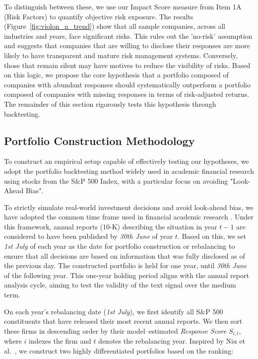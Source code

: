 \documentclass[sigconf]{acmart}
\begin{document}
To distinguish between these, we use our Impact Score measure from Item 1A (Risk Factors) to quantify objective risk exposure. The results (Figure~\ref{fig:violon_n_trend}) show that all sample companies, across all industries and years, face significant risks. This rules out the 'no-risk' assumption and suggests that companies that are willing to disclose their responses are more likely to have transparent and mature risk management systems. Conversely, those that remain silent may have motives to reduce the visibility of risks. Based on this logic, we propose the core hypothesis that a portfolio composed of companies with abundant responses should systematically outperform a portfolio composed of companies with missing responses in terms of risk-adjusted returns. The remainder of this section rigorously tests this hypothesis through backtesting.

\subsection{Portfolio Construction Methodology}

To construct an empirical setup capable of effectively testing our hypotheses, we adopt the portfolio backtesting method widely used in academic financial research using stocks from the S\&P 500 Index, with a particular focus on avoiding "Look-Ahead Bias".

To strictly simulate real-world investment decisions and avoid look-ahead bias, we have adopted the common time frame used in financial academic research \cite{fama1993common, carhart1997persistence, cooper2008asset, hou2015digesting}. Under this framework, annual reports (10-K) describing the situation in year $t-1$ are considered to have been published by \textit{30th June} of year $t$. Based on this, we set \textit{1st July} of each year as the date for portfolio construction or rebalancing to ensure that all decisions are based on information that was fully disclosed as of the previous day. The constructed portfolio is held for one year, until \textit{30th June} of the following year. This one-year holding period aligns with the annual report analysis cycle, aiming to test the validity of the text signal over the medium term.

On each year’s rebalancing date (\textit{1st July}), we first identify all S\&P 500 constituents that have released their most recent annual reports. We then sort these firms in descending order by their model–estimated \emph{Response Score} $S_{i,t}$, where $i$ indexes the firm and $t$ denotes the rebalancing year. 
Inspired by Niu et al.~\cite{niu2024evaluating}, we construct two highly differentiated portfolios based on the ranking:
\end{document}
